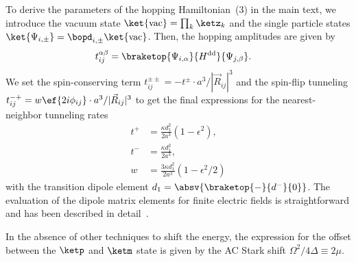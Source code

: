 To derive the parameters of the hopping Hamiltonian~(3) in the main text, we introduce the vacuum state $\ket{\text{vac}}=\prod_k \ketz_k$ and the single particle states $\ket{\Psi_{i,\pm}}=\bopd_{i,\pm} \ket{\text{vac}}$.
Then, the hopping amplitudes are given by
\begin{align}
    t^{\alpha\beta}_{ij} &= \braketop{\Psi_{i,\alpha}}{H^\text{dd}}{\Psi_{j,\beta}}.
\end{align}
We set the spin-conserving term $t^{\pm\pm}_{ij}=-t^\pm \cdot a^3/|\vec{R}_{ij}|^3$ and the spin-flip tunneling $t^{-+}_{ij}=w \ef{2i \phi_{ij}} \cdot a^3/|\vec{R}_{ij}|^3$ to get the final expressions for the nearest-neighbor tunneling rates
\begin{align}
    t^+ &= \frac{\kappa d_{1}^2}{2a^3} (1 - \epsilon^2), \\
    t^- &= \frac{\kappa d_{1}^2}{2a^3}, \\
    w &= \frac{3 \kappa d_{1}^2}{2a^3} (1-\epsilon^2/2)
\end{align}
with the transition dipole element $d_{1}=\absv{\braketop{-}{d^{-\vphantom{0}}}{{0}}}$.
The evaluation of the dipole matrix elements for finite electric fields is straightforward and has been described in detail~\cite{Micheli2007}.

In the absence of other techniques to shift the energy, the expression for the offset between the $\ketp$ and $\ketm$ state is given by the AC Stark shift $\Omega^2/4\Delta\equiv 2\mu$.

